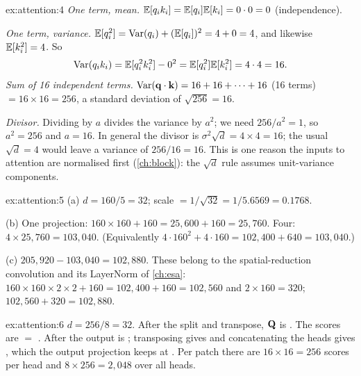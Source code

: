 \begin{solution}{ex:attention:4}
\emph{One term, mean.} $\mathbb{E}[q_ik_i] = \mathbb{E}[q_i]\mathbb{E}[k_i] = 0\cdot0 = 0$ (independence).

\emph{One term, variance.} $\mathbb{E}[q_i^2] = \operatorname{Var}(q_i) + (\mathbb{E}[q_i])^2 = 4 + 0 = 4$, and
likewise $\mathbb{E}[k_i^2] = 4$. So
\[
  \operatorname{Var}(q_ik_i) = \mathbb{E}[q_i^2k_i^2] - 0^2 = \mathbb{E}[q_i^2]\mathbb{E}[k_i^2] = 4\cdot4 = 16 .
\]
\emph{Sum of 16 independent terms.} $\operatorname{Var}(\mathbf{q}\cdot\mathbf{k}) = 16 + 16 + \dots
+ 16$ (16 terms) $= 16\times16 = 256$, a standard deviation of $\sqrt{256} = 16$.

\emph{Divisor.} Dividing by $a$ divides the variance by $a^2$; we need $256/a^2 = 1$, so
$a^2 = 256$ and $a = 16$. In general the divisor is $\sigma^2\sqrt d = 4\times4 = 16$; the usual
$\sqrt d = 4$ would leave a variance of $256/16 = 16$. This is one reason the inputs to attention
are normalised first (\cref{ch:block}): the $\sqrt d$ rule assumes unit-variance components.
\end{solution}

\begin{solution}{ex:attention:5}
(a) $d = 160/5 = 32$; scale $= 1/\sqrt{32} = 1/5.6569 = 0.1768$.

(b) One projection: $160\times160 + 160 = 25{,}600 + 160 = 25{,}760$. Four:
$4\times25{,}760 = 103{,}040$. (Equivalently $4\cdot160^2 + 4\cdot160 = 102{,}400 + 640 = 103{,}040$.)

(c) $205{,}920 - 103{,}040 = 102{,}880$. These belong to the spatial-reduction convolution and its
LayerNorm of \cref{ch:esa}: $160\times160\times2\times2 + 160 = 102{,}400 + 160 = 102{,}560$ and
$2\times160 = 320$; $102{,}560 + 320 = 102{,}880$.
\end{solution}

\begin{solution}{ex:attention:6}
$d = 256/8 = 32$. After the split and transpose, $\mathbf{Q}$ is . The scores
are  $=$ . After
 the output is ; transposing gives 
and concatenating the heads gives , which the output projection keeps at
. Per patch there are $16\times16 = 256$ scores per head and
$8\times256 = 2{,}048$ over all heads.
\end{solution}
